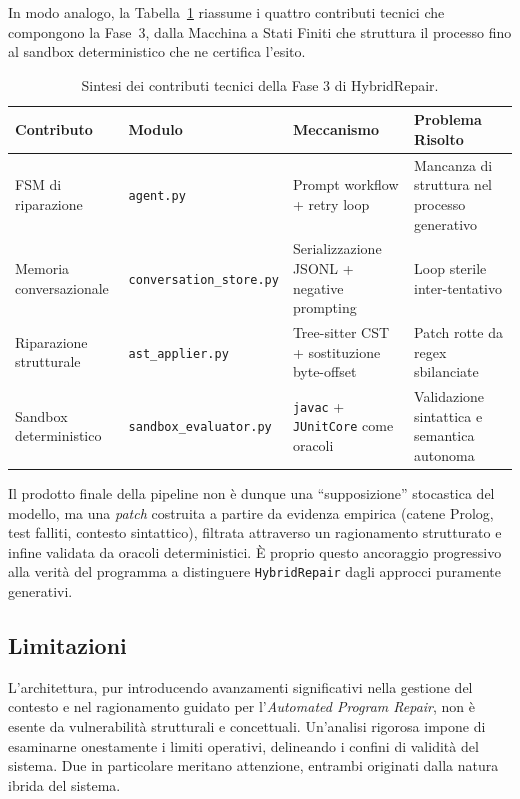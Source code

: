 In modo analogo, la Tabella~\ref{tab:sintesi_fase3} riassume i quattro contributi tecnici
che compongono la Fase~3, dalla Macchina a Stati Finiti che struttura il processo fino al
sandbox deterministico che ne certifica l'esito.

\begin{table}[H]
\centering
\begin{tabular}{>{\raggedright\arraybackslash}p{2.8cm} >{\raggedright\arraybackslash}p{4.6cm} >{\raggedright\arraybackslash}p{4.2cm} >{\raggedright\arraybackslash}p{3.4cm}}
\toprule
\textbf{Contributo} & \textbf{Modulo} & \textbf{Meccanismo} & \textbf{Problema Risolto} \\
\midrule
FSM di riparazione & \texttt{agent.py} & Prompt workflow + retry loop & Mancanza di struttura nel processo generativo \\
Memoria conversazionale & \texttt{conversation\_store.py} & Serializzazione JSONL + negative prompting & Loop sterile inter-tentativo \\
Riparazione strutturale & \texttt{ast\_applier.py} & Tree-sitter CST + sostituzione byte-offset & Patch rotte da regex sbilanciate \\
Sandbox deterministico & \texttt{sandbox\_evaluator.py} & \texttt{javac} + \texttt{JUnitCore} come oracoli & Validazione sintattica e semantica autonoma \\
\bottomrule
\end{tabular}
\caption{Sintesi dei contributi tecnici della Fase 3 di HybridRepair.}
\label{tab:sintesi_fase3}
\end{table}

Il prodotto finale della pipeline non è dunque una ``supposizione'' stocastica del modello,
ma una \textit{patch} costruita a partire da evidenza empirica (catene Prolog, test falliti,
contesto sintattico), filtrata attraverso un ragionamento strutturato e infine validata da
oracoli deterministici. È proprio questo ancoraggio progressivo alla verità del programma a
distinguere \texttt{HybridRepair} dagli approcci puramente generativi.

\subsection{Limitazioni}

L'architettura, pur introducendo avanzamenti significativi nella gestione del contesto e nel
ragionamento guidato per l'\textit{Automated Program Repair}, non è esente da vulnerabilità
strutturali e concettuali. Un'analisi rigorosa impone di esaminarne onestamente i limiti
operativi, delineando i confini di validità del sistema. Due in particolare meritano
attenzione, entrambi originati dalla natura ibrida del sistema.

